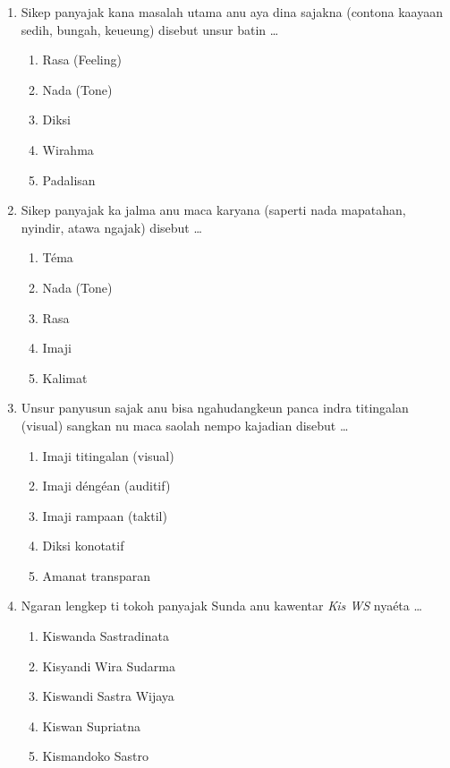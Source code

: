 \documentclass[12pt,a4paper]{article}
\begin{document}
\begin{enumerate}[leftmargin=*]
\item Sikep panyajak kana masalah utama anu aya dina sajakna (contona kaayaan sedih, bungah, keueung) disebut unsur batin \dots
    \begin{enumerate}[label=\alph*.]
        \item Rasa (Feeling)
        \item Nada (Tone)
        \item Diksi
        \item Wirahma
        \item Padalisan
    \end{enumerate}

\item Sikep panyajak ka jalma anu maca karyana (saperti nada mapatahan, nyindir, atawa ngajak) disebut \dots
    \begin{enumerate}[label=\alph*.]
        \item Téma
        \item Nada (Tone)
        \item Rasa
        \item Imaji
        \item Kalimat
    \end{enumerate}

\item Unsur panyusun sajak anu bisa ngahudangkeun panca indra titingalan (visual) sangkan nu maca saolah nempo kajadian disebut \dots
    \begin{enumerate}[label=\alph*.]
        \item Imaji titingalan (visual)
        \item Imaji déngéan (auditif)
        \item Imaji rampaan (taktil)
        \item Diksi konotatif
        \item Amanat transparan
    \end{enumerate}

\item Ngaran lengkep ti tokoh panyajak Sunda anu kawentar \textit{Kis WS} nyaéta \dots
    \begin{enumerate}[label=\alph*.]
        \item Kiswanda Sastradinata
        \item Kisyandi Wira Sudarma
        \item Kiswandi Sastra Wijaya
        \item Kiswan Supriatna
        \item Kismandoko Sastro
    \end{enumerate}


\end{enumerate}
\end{document}
